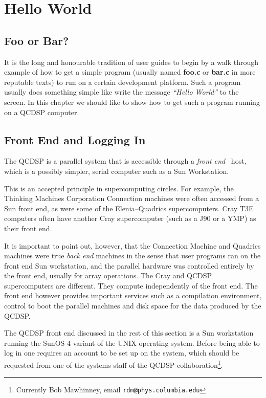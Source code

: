 \chapter{Hello World}\label{c:HelloWorld}
\section{Foo or Bar?}
It is the long and honourable tradition of user guides to 
begin by a walk through example of how to get a simple program
(usually named {\bf foo.c} or {\bf bar.c} in more reputable 
texts) to run on a certain development platform. Such a program
usually does something simple like write the message {\em ``Hello World''}
to the screen. In this chapter we should like to show how to 
get such a program running on a QCDSP computer.

\section{Front End and Logging In}
The QCDSP is a parallel system that is accessible through a {\em front end}
 \ host, which is a possibly simpler, serial computer such as a Sun Workstation.

This is an accepted principle in supercomputing circles. For example,
the Thinking Machines Corporation Connection machines were often 
accessed from a Sun front end, as were some of the Elenia--Quadrics
supercomputers. Cray T3E computers often have another Cray supercomputer 
(such as a J90 or a YMP) as their front end.

It is important to point out, however, that the Connection Machine and 
Quadrics machines were true {\em back end} machines in the sense that
user programs ran on the front end Sun workstation, and the parallel hardware
was controlled entirely by the front end, usually for array operations.
The Cray and QCDSP supercomputers are different. They compute independently
of the front end. The front end however provides important services such
as a compilation environment, control to boot the parallel machines and
disk space for the data produced by the QCDSP. 

The QCDSP front end discussed in the rest of this section is a Sun
workstation running the SunOS 4 variant of the UNIX operating system.
Before being able to log in one requires an account to be set up
on the system, which should be requested from one of the systems staff
of the QCDSP collaboration\footnote{Currently Bob Mawhinney, email {\tt rdm@phys.columbia.edu}}.

